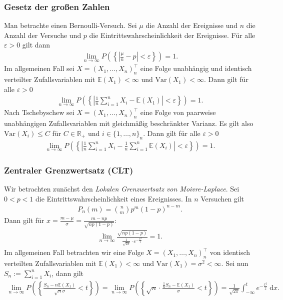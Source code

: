 \documentclass[10pt, a4paper]{extarticle}
\theoremstyle{nonumberplain}
\theoremstyle{plain}
\begin{document}
\subsubsection{Gesetz der großen Zahlen}
Man betrachte einen Bernoulli-Versuch. Sei $ \mu $ die Anzahl der Ereignisse und $ n $ die Anzahl der Versuche und $ p $ die Eintrittswahrscheinlichkeit der Ereignisse. Für alle $ \varepsilon>0 $ gilt dann \begin{align*}
\lim_{n\to\infty}P\left(\left\lbrace \left|\frac{\mu}{n}-p\right|<\varepsilon\right\rbrace\right)=1.
\end{align*}
Im allgemeinen Fall sei $ X=(X_1,\ldots,X_n)^\top_n $ eine Folge unabhängig und identisch verteilter Zufallsvariablen mit $ \mathbb{E}(X_1)<\infty $ und $ \mathrm{Var}(X_1)<\infty $. Dann gilt für alle $ \varepsilon>0 $ \begin{align*}
\lim_{n\to\infty}P\left(\left\lbrace\left|\frac{1}{n}\sum_{i=1}^{n} X_i-\mathbb{E}(X_1)\right|<\varepsilon\right\rbrace\right)=1.
\end{align*}
Nach Tschebyschew sei $ X=(X_1,\ldots,X_n)^\top_n $ eine Folge von paarweise unabhängigen Zufallsvariablen mit gleichmäßig beschränkter Varianz. Es gilt also $ \mathrm{Var}(X_i)\leq C $ für $ C\in\mathbb{R}_+ $ und $ i\in\{1,\ldots,n\}_n $. Dann gilt für alle $ \varepsilon>0 $ \begin{align*}
\lim_{n\to \infty} P\left(\left\lbrace\left|\frac{1}{n}\sum_{i=1}^{n} X_i-\frac{1}{n}\sum_{i=1}^{n} \mathbb{E}(X_i)\right|<\varepsilon\right\rbrace\right)=1.
\end{align*}

\subsubsection{Zentraler Grenzwertsatz (CLT)}
Wir betrachten zunächst den \emph{Lokalen Grenzwertsatz von Moivre-Laplace}. Sei $ 0<p<1 $ die Eintrittswahrscheinlichkeit eines Ereignisses. In $ n $ Versuchen gilt \begin{align*}
P_n(m)=\binom{n}{m}p^m(1-p)^{n-m}.
\end{align*}
Dann gilt für $ x=\frac{m-\mu}{\sigma}=\frac{m-np}{\sqrt{np(1-p)}} $:\begin{align*}
\lim_{n\to \infty} \frac{\sqrt{np(1-p)}}{\frac{1}{\sqrt{2\pi}}\cdot e^{-\frac{x^2}{2}}}=1.
\end{align*}
Im allgemeinen Fall betrachten wir eine Folge $ X=(X_1,\ldots,X_n)^\top_n $ von identisch verteilten Zufallsvariablen  mit $ \mathbb{E}(X_1)<\infty $ und $ \mathrm{Var}(X_1)=\sigma^2<\infty $. Sei nun $ S_n:=\sum_{i=1}^{n} X_i $, dann gilt \begin{align*}
\lim_{n\to \infty} P\left(\left\lbrace\frac{S_n-n\mathbb{E}(X_1)}{\sqrt{n}\sigma}<t\right\rbrace\right)=\lim_{n\to \infty} P\left(\left\lbrace\sqrt{n}\cdot\frac{\frac{1}{n} S_n-\mathbb{E}(X_1)}{\sigma}<t\right\rbrace\right)=\frac{1}{\sqrt{2\pi}}\int_{-\infty}^{t} e^{-\frac{x^2}{2}}\ \mathrm{d}x.
\end{align*}
\end{document}
